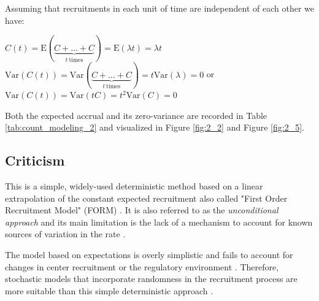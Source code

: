 Assuming that recruitments in each unit of time are independent of each other we have:

$C(t) = \textrm{E}(\underbrace{C+\ldots+C}_{t \ \text{times}}) = \textrm{E}(\lambda t) = \lambda t$\\
$\textrm{Var}(C(t)) = \textrm{Var}(\underbrace{C+\ldots+C}_{t \ \text{times}}) = t \textrm{Var}(\lambda) = 0$ or $\textrm{Var}(C(t))=\textrm{Var}(tC)=t^2\textrm{Var}(C)=0$

Both the expected accrual and its zero-variance are recorded in Table \ref{tab:count_modeling_2}
and visualized in Figure \ref{fig:2_2} and Figure \ref{fig:2_5}.

\subsection{Criticism}

This is a simple, widely-used deterministic method based on a linear extrapolation of the constant expected recruitment also called "First Order Recruitment Model" (FORM) \citep{comfort2013}. It is also referred to as the \textit{unconditional approach} and its main limitation is the lack of a mechanism to account for known sources of variation in the rate \citep{carter2005practical}. 

The model based on expectations is overly simplistic and fails to account for changes in center recruitment or the regulatory environment \citep{barnard2010systematic}. Therefore, stochastic models that incorporate randomness in the recruitment process are more suitable than this simple deterministic approach \citep{zhang2012modeling}.



\begin{table}[h!]
\centering
{}
\caption{Moments and aleatory and epistemic uncertainty of recruitment in one unit of time recruitment covered by different models for counts.}
\label{tab:count_modeling}
\end{table}




